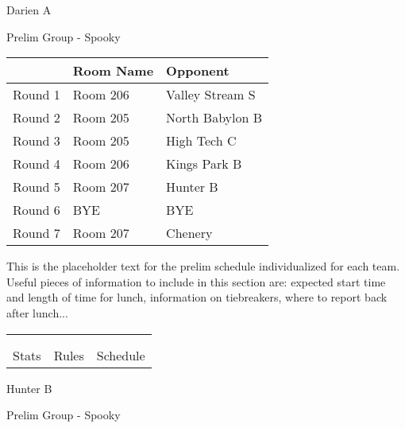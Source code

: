 \documentclass{article}%
\begin{document}
\newpage%
%
\begin{center}%
\begin{Huge}%
Darien A%
\end{Huge}%
\vspace*{12pt}%
\linebreak%
\begin{Large}%
Prelim Group {-} Spooky%
\end{Large}%
\end{center}%
\vspace*{4pt}%
\begin{tabularx}{\textwidth}{|c|Y|Y|}%
\hline%
&Room Name&Opponent\\%
\hline%
Round 1&Room 206&Valley Stream S\\%
Round 2&Room 205&North Babylon B\\%
Round 3&Room 205&High Tech C\\%
Round 4&Room 206&Kings Park B\\%
Round 5&Room 207&Hunter B\\%
Round 6&BYE&BYE\\%
Round 7&Room 207&Chenery\\%
\hline%
\end{tabularx}%
\vspace*{30pt}%
\linebreak%
This is the placeholder text for the prelim schedule individualized for each team. Useful pieces of information to include in this section are: expected start time and length of time for lunch, information on tiebreakers, where to report back after lunch...%
\vspace*{30pt}%
\newline%
%
\begin{tabularx}{\textwidth}{YYY}%
  &  &  \\%
\\%
Stats&Rules&Schedule\\%
\end{tabularx}%
\newpage%
%
\begin{center}%
\begin{Huge}%
Hunter B%
\end{Huge}%
\vspace*{12pt}%
\linebreak%
\begin{Large}%
Prelim Group {-} Spooky%
\end{Large}%
\end{center}%
\end{document}

